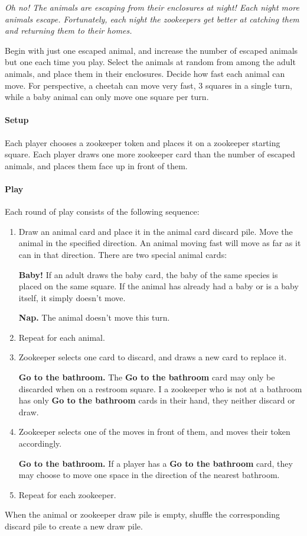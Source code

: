 \documentclass[12pt,twocolumn]{article}
\begin{document}
  \color{black}
\emph{Oh no! The animals are escaping from their enclosures at night! Each night more
animals escape.  Fortunately, each night the zookeepers get better at catching
them and returning them to their homes.}

Begin with just one escaped animal, and increase the number of escaped animals
but one each time you play.  Select the animals at random from among the adult
animals, and place them in their enclosures.  Decide how fast each animal can
move.  For perspective, a cheetah can move very fast, 3 squares in a single
turn, while a baby animal can only move one square per turn.

\paragraph{Setup}
Each player chooses a zookeeper token and places it on a zookeeper starting
square.  Each player draws one more zookeeper card than the number of escaped
animals, and places them face up in front of them.

\paragraph{Play}
Each round of play consists of the following sequence:
\begin{enumerate}
\item Draw an animal card and place it in the animal card discard pile.  Move
the animal in the specified direction.  An animal moving fast will move as far
as it can in that direction.  There are two special animal cards:

\textbf{Baby!} If an adult draws the baby card, the baby of the same species is
placed on the same square.  If the animal has already had a baby or is a baby
itself, it simply doesn't move.

\textbf{Nap.} The animal doesn't move this turn.
\item Repeat for each animal.
\item Zookeeper selects one card to discard, and draws a new card to replace it.

\textbf{Go to the bathroom.}
The \textbf{Go to the bathroom} card may only be discarded when on a restroom
square.  I a zookeeper who is not at a bathroom has only \textbf{Go to the
bathroom} cards in their hand, they neither discard or draw.
\item  Zookeeper selects one of the moves in front of them, and moves their
token accordingly.

\textbf{Go to the bathroom.}  If a player has a \textbf{Go to the bathroom}
card, they may choose to move one space in the direction of the nearest
bathroom.
\item Repeat for each zookeeper.
\end{enumerate}
When the animal or zookeeper draw pile is empty, shuffle the
corresponding discard pile to create a new draw pile.
\end{document}
